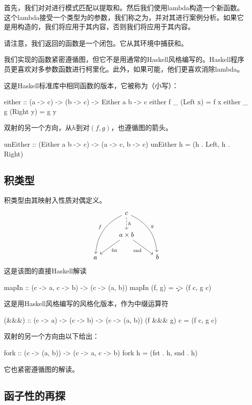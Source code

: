 \documentclass[DaoFP]{subfiles}
\begin{document}
首先，我们对对进行模式匹配以提取和。然后我们使用lambda构造一个新函数。这个lambda接受一个类型为的参数，我们称之为，并对其进行案例分析。如果它是用构造的，我们将应用于其内容，否则我们将应用于其内容。

请注意，我们返回的函数是一个闭包。它从其环境中捕获和。

我们实现的函数紧密遵循图，但它不是用通常的Haskell风格编写的。Haskell程序员更喜欢对多参数函数进行柯里化。此外，如果可能，他们更喜欢消除lambda。

这是Haskell标准库中相同函数的版本，它被称为（小写）：
\begin{haskell}
either :: (a -> c) -> (b -> c) -> Either a b -> c
either f _ (Left x)     =  f x
either _ g (Right y)    =  g y
\end{haskell}

双射的另一个方向，从$h$到对$(f, g)$，也遵循图的箭头。
\begin{haskell}
unEither :: (Either a b -> c) -> (a -> c, b -> c)
unEither h = (h . Left, h . Right)
\end{haskell}


\subsection{积类型}

积类型由其映射入性质对偶定义。
\[
 \begin{tikzcd}
 & c
\arrow[d, dashed, "h"]
 \arrow[ddl, bend right, "f"']
 \arrow[ddr, bend left, "g"]
\\
&a \times b
 \arrow[dl,  "\text{fst}"]
  \arrow[dr,   "\text{snd}"']
\\
a && b
 \end{tikzcd}
\]
这是该图的直接Haskell解读
\begin{haskell}
mapIn :: (c -> a, c -> b) -> (c -> (a, b))
mapIn (f, g) = \c -> (f c, g c)
\end{haskell}
这是用Haskell风格编写的风格化版本，作为中缀运算符\hask{&&&}
\begin{haskell}
(&&&) :: (c -> a) -> (c -> b) -> (c -> (a, b))
(f &&& g) c = (f c, g c)
\end{haskell}
双射的另一个方向由以下给出：
\begin{haskell}
fork :: (c -> (a, b)) -> (c -> a, c -> b)
fork h = (fst . h, snd . h)
\end{haskell}
它也紧密遵循图的解读。

\subsection{函子性的再探}
\end{document}
